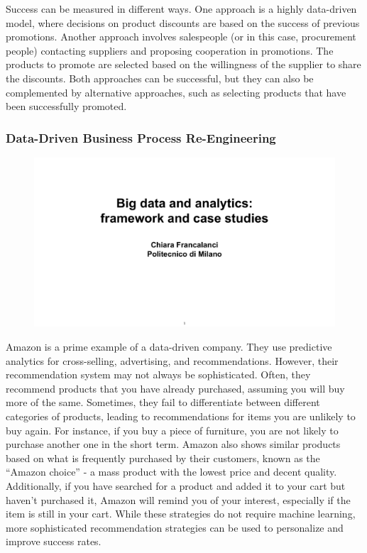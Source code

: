 Success can be measured in different ways. One approach is a highly
data-driven model, where decisions on product discounts are based on the
success of previous promotions. Another approach involves salespeople (or in this case, procurement people)
contacting suppliers and proposing cooperation in promotions. The
products to promote are selected based on the willingness of the
supplier to share the discounts. Both approaches can be successful, but
they can also be complemented by alternative approaches, such as
selecting products that have been successfully promoted.

\subsubsection{Data-Driven Business Process Re-Engineering}

\begin{figure}[!h]
    \centering
    \includegraphics[page=66, trim = 1cm 5cm 1.5cm 3cm, clip, width=\textwidth]{images/06 - BIG_DATA.pdf}
\end{figure}

Amazon is a prime example of a data-driven company. They use predictive
analytics for cross-selling, advertising, and recommendations. However,
their recommendation system may not always be sophisticated. Often, they
recommend products that you have already purchased, assuming you will
buy more of the same. Sometimes, they fail to differentiate between
different categories of products, leading to recommendations for items
you are unlikely to buy again. For instance, if you buy a piece of
furniture, you are not likely to purchase another one in the short term.
Amazon also shows similar products based on what is frequently purchased
by their customers, known as the ``Amazon choice'' - a mass product with
the lowest price and decent quality. Additionally, if you have searched
for a product and added it to your cart but haven't purchased it, Amazon
will remind you of your interest, especially if the item is still in
your cart. While these strategies do not require machine learning, more
sophisticated recommendation strategies can be used to personalize and
improve success rates.

